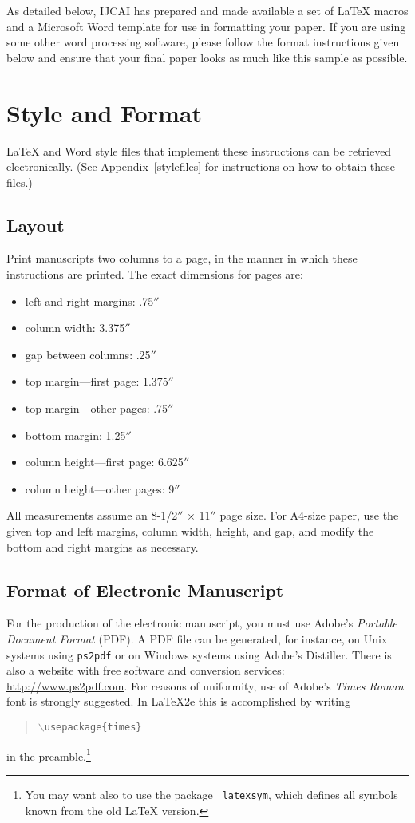 \documentclass{article}
\begin{document}
As detailed below, IJCAI has prepared and made available a set of
\LaTeX{} macros and a Microsoft Word template for use in formatting
your paper. If you are using some other word processing software, please follow the format instructions given below and ensure that your final paper looks as much like this sample as possible.

\section{Style and Format}

\LaTeX{} and Word style files that implement these instructions
can be retrieved electronically. (See Appendix~\ref{stylefiles} for
instructions on how to obtain these files.)

\subsection{Layout}

Print manuscripts two columns to a page, in the manner in which these
instructions are printed. The exact dimensions for pages are:
\begin{itemize}
\item left and right margins: .75$''$
\item column width: 3.375$''$
\item gap between columns: .25$''$
\item top margin---first page: 1.375$''$
\item top margin---other pages: .75$''$
\item bottom margin: 1.25$''$
\item column height---first page: 6.625$''$
\item column height---other pages: 9$''$
\end{itemize}

All measurements assume an 8-1/2$''$ $\times$ 11$''$ page size. For
A4-size paper, use the given top and left margins, column width,
height, and gap, and modify the bottom and right margins as necessary.

\subsection{Format of Electronic Manuscript}

For the production of the electronic manuscript, you must use Adobe's
{\em Portable Document Format} (PDF). A PDF file can be generated, for
instance, on Unix systems using {\tt ps2pdf} or on Windows systems
using Adobe's Distiller. There is also a website with free software
and conversion services: \url{http://www.ps2pdf.com}. For reasons of
uniformity, use of Adobe's {\em Times Roman} font is strongly suggested. 
In \LaTeX2e{} this is accomplished by writing
\begin{quote} 
\mbox{\tt $\backslash$usepackage\{times\}}
\end{quote}
in the preamble.\footnote{You may want also to use the package {\tt
latexsym}, which defines all symbols known from the old \LaTeX{}
version.}
\end{document}
